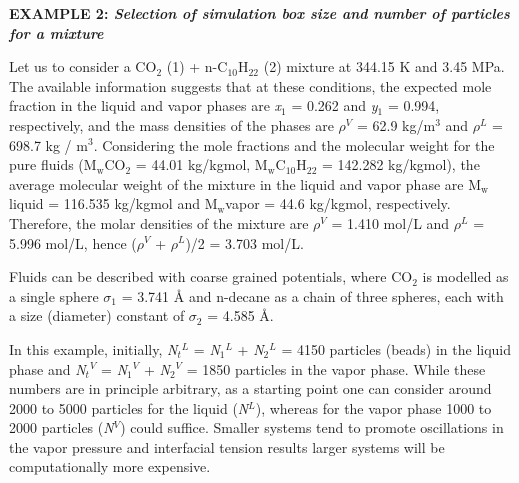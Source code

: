 \documentclass[9pt,bestpractices]{livecoms}
\begin{document}
\begin{mdframed}[linewidth=0pt,backgroundcolor=LiveCoMSLightBlue!8,fontcolor=LiveCoMSDarkBlue!80!black]
  \textbf{EXAMPLE 2: \textit{Selection of simulation box size and number of particles for a mixture}}

Let us to consider a CO$_{2}$ (1) + n-C$_{10}$H$_{22}$ (2) mixture at 344.15
K and 3.45 MPa. The available information\citep{shaver2001} suggests that at these
conditions, the expected mole fraction in the liquid and vapor phases are
\textit{x}$_{1}$ = 0.262 and \textit{y}$_{1}$ = 0.994, respectively, and the
mass densities of the phases are ${\rho}$$^{V}$ = 62.9 kg/m$^{3}$ and
${\rho}$$^{L}$ = 698.7 kg / m$^{3}$. Considering the mole fractions and the
molecular weight for the pure fluids (M$_{\mathrm{w}}$CO$_{2}$ = 44.01
kg/kgmol, M$_{\mathrm{w}}$C$_{10}$H$_{22}$ = 142.282 kg/kgmol), the average molecular
weight of the mixture in the liquid and vapor phase are M$_{\mathrm{w}}$liquid
= 116.535 kg/kgmol and M$_{\mathrm{w}}$vapor = 44.6 kg/kgmol, respectively.
Therefore, the molar densities of the mixture are  ${\rho}$$^{V}$ = 1.410 mol/L
and ${\rho}$$^{L}$ = 5.996 mol/L, hence (${\rho}$$^{V}$ + ${\rho}$$^{L}$)/2
= 3.703 mol/L.

Fluids can be described with coarse grained potentials, where CO$_{2}$ is
modelled as a single sphere ${\sigma}$$_{1}$ = 3.741 \AA{}\citep{mejia2014a}
 and n-decane as
a chain of three spheres, each with a size (diameter) constant of
${\sigma}$$_{2}$ = 4.585 \AA{}\citep{mejia2014b}. 

In this example, initially, \textit{N}$_{t}$$^{L}$ = \textit{N}$_{1}$$^{L}$
+ \textit{N}$_{2}$$^{L}$ = 4150 particles (beads) in the liquid phase and
\textit{N}$_{t}$$^{V}$ = \textit{N}$_{1}$$^{V}$ + \textit{N}$_{2}$$^{V}$ = 1850
particles in the vapor phase. While these numbers are in principle arbitrary,
as a starting point one can consider around 2000 to 5000 particles for the
liquid (\textit{N}$^{L}$), whereas for the vapor phase 1000 to 2000 particles
(\textit{N}$^{V}$) could suffice. Smaller systems tend to promote oscillations
in the vapor pressure and interfacial tension results \citep{gonzalez2005,orea2005,janecek2009}
larger systems will be computationally more expensive.


\end{mdframed}
\end{document}
